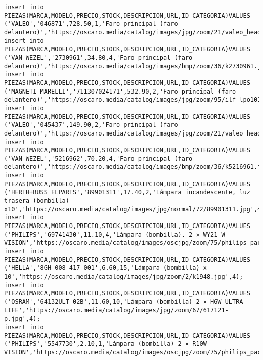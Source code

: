 \begin{lstlisting}
insert into PIEZAS(MARCA,MODELO,PRECIO,STOCK,DESCRIPCION,URL,ID_CATEGORIA)VALUES ('VALEO','046871',728.50,1,'Faro principal (faro delantero)','https://oscaro.media/catalog/images/jpg/zoom/21/valeo_headlamp_046871_01.jpg',4);
insert into PIEZAS(MARCA,MODELO,PRECIO,STOCK,DESCRIPCION,URL,ID_CATEGORIA)VALUES ('VAN WEZEL','2730961',34.80,4,'Faro principal (faro delantero)','https://oscaro.media/catalog/images/bmp/zoom/36/k2730961.jpg',4);
insert into PIEZAS(MARCA,MODELO,PRECIO,STOCK,DESCRIPCION,URL,ID_CATEGORIA)VALUES ('MAGNETI MARELLI','711307024171',532.90,2,'Faro principal (faro delantero)','https://oscaro.media/catalog/images/jpg/zoom/95/ilf_lpo101_wr.jpg',4);
insert into PIEZAS(MARCA,MODELO,PRECIO,STOCK,DESCRIPCION,URL,ID_CATEGORIA)VALUES ('VALEO','045437',149.90,2,'Faro principal (faro delantero)','https://oscaro.media/catalog/images/jpg/zoom/21/valeo_headlamp_045437_01.jpg',4);
insert into PIEZAS(MARCA,MODELO,PRECIO,STOCK,DESCRIPCION,URL,ID_CATEGORIA)VALUES ('VAN WEZEL','5216962',70.20,4,'Faro principal (faro delantero)','https://oscaro.media/catalog/images/bmp/zoom/36/k5216961.jpg',4);
insert into PIEZAS(MARCA,MODELO,PRECIO,STOCK,DESCRIPCION,URL,ID_CATEGORIA)VALUES ('HERTH+BUSS ELPARTS','89901311',17.40,2,'Lámpara incandescente, luz trasera (bombilla) x10','https://oscaro.media/catalog/images/jpg/normal/72/89901311.jpg',4);
insert into PIEZAS(MARCA,MODELO,PRECIO,STOCK,DESCRIPCION,URL,ID_CATEGORIA)VALUES ('PHILIPS','69741430',11.10,4,'Lámpara (bombilla). 2 ✕ WY21 W VISION','https://oscaro.media/catalog/images/oscjpg/zoom/75/philips_pack_pr_wy21w_69741430_12071b2_s_emea_16.jpg',4);
insert into PIEZAS(MARCA,MODELO,PRECIO,STOCK,DESCRIPCION,URL,ID_CATEGORIA)VALUES ('HELLA','8GH 008 417-001',6.60,15,'Lámpara (bombilla) x 10','https://oscaro.media/catalog/images/jpg/zoom/2/k1948.jpg',4);
insert into PIEZAS(MARCA,MODELO,PRECIO,STOCK,DESCRIPCION,URL,ID_CATEGORIA)VALUES ('OSRAM','64132ULT-02B',11.60,10,'Lámpara (bombilla) 2 ✕ H6W ULTRA LIFE','https://oscaro.media/catalog/images/jpg/zoom/67/617121-p.jpg',4);
insert into PIEZAS(MARCA,MODELO,PRECIO,STOCK,DESCRIPCION,URL,ID_CATEGORIA)VALUES ('PHILIPS','5547730',2.10,1,'Lámpara (bombilla) 2 ✕ R10W VISION','https://oscaro.media/catalog/images/oscjpg/zoom/75/philips_pack_pr_r10w_05547730_12814b2_s_emea_16.jpg',4);


\end{lstlisting}
